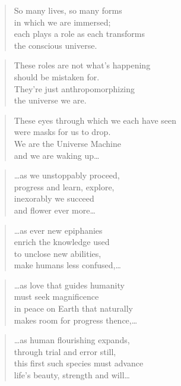 \documentclass[10pt,a4paper]{article}
\begin{document}
\begin{multicols}{2}
\begin{verse}
So many lives, so many forms\\
in which we are immersed;\\
each plays a role as each transforms\\
the conscious universe.
\end{verse}

\begin{verse}
These roles are not what’s happening\\
should be mistaken for.\\
They’re just anthropomorphizing\\
the universe we are.
\end{verse}

\begin{verse}
These eyes through which we each have seen\\
were masks for us to drop.\\
We are the Universe Machine\\
and we are waking up…
\end{verse}

\begin{verse}
…as we unstoppably proceed,\\
progress and learn, explore,\\
inexorably we succeed\\
and flower ever more…
\end{verse}

\begin{verse}
…as ever new epiphanies\\
enrich the knowledge used\\
to unclose new abilities,\\
make humans less confused,…
\end{verse}

\begin{verse}
…as love that guides humanity\\
must seek magnificence\\
in peace on Earth that naturally\\
makes room for progress thence,…
\end{verse}

\begin{verse}
…as human flourishing expands,\\
through trial and error still,\\
this first such species must advance\\
life’s beauty, strength and will…
\end{verse}


\end{multicols}
\end{document}
